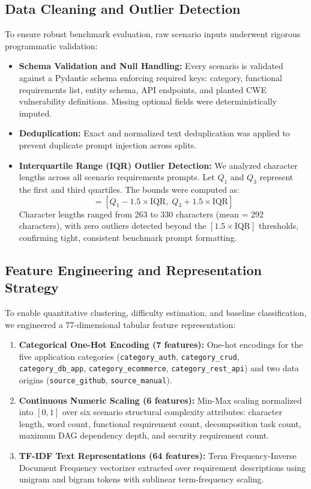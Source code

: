 \documentclass[10pt,journal,compsoc]{IEEEtran}
\begin{document}
\subsection{Data Cleaning and Outlier Detection}
To ensure robust benchmark evaluation, raw scenario inputs underwent rigorous programmatic validation:
\begin{itemize}
    \item \textbf{Schema Validation and Null Handling:} Every scenario is validated against a Pydantic schema enforcing required keys: category, functional requirements list, entity schema, API endpoints, and planted CWE vulnerability definitions. Missing optional fields were deterministically imputed.
    \item \textbf{Deduplication:} Exact and normalized text deduplication was applied to prevent duplicate prompt injection across splits.
    \item \textbf{Interquartile Range (IQR) Outlier Detection:} We analyzed character lengths across all scenario requirements prompts. Let $Q_1$ and $Q_3$ represent the first and third quartiles. The bounds were computed as:
    \begin{equation}
    [\text{Lower}, \text{Upper}] = [Q_1 - 1.5 \times \text{IQR}, \; Q_3 + 1.5 \times \text{IQR}]
    \end{equation}
    Character lengths ranged from 263 to 330 characters (mean = 292 characters), with zero outliers detected beyond the $[1.5 \times \text{IQR}]$ thresholds, confirming tight, consistent benchmark prompt formatting.
\end{itemize}

\subsection{Feature Engineering and Representation Strategy}
To enable quantitative clustering, difficulty estimation, and baseline classification, we engineered a 77-dimensional tabular feature representation:
\begin{enumerate}
    \item \textbf{Categorical One-Hot Encoding (7 features):} One-hot encodings for the five application categories (\texttt{category\_auth}, \texttt{category\_crud}, \texttt{category\_db\_app}, \texttt{category\_ecommerce}, \texttt{category\_rest\_api}) and two data origins (\texttt{source\_github}, \texttt{source\_manual}).
    \item \textbf{Continuous Numeric Scaling (6 features):} Min-Max scaling normalized into $[0, 1]$ over six scenario structural complexity attributes: character length, word count, functional requirement count, decomposition task count, maximum DAG dependency depth, and security requirement count.
    \item \textbf{TF-IDF Text Representations (64 features):} Term Frequency-Inverse Document Frequency vectorizer extracted over requirement descriptions using unigram and bigram tokens with sublinear term-frequency scaling.
\end{enumerate}
\end{document}
